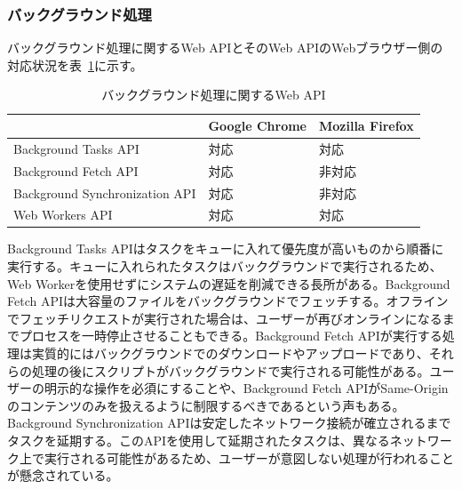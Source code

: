 \subsubsection{バックグラウンド処理}\label{subsubsection:バックグラウンド処理}
バックグラウンド処理に関するWeb APIとそのWeb APIのWebブラウザー側の対応状況を表~\ref{table:バックグラウンド処理に関するWeb API}に示す。
\begin{table}
  \caption{バックグラウンド処理に関するWeb API}\label{table:バックグラウンド処理に関するWeb API}
  \centering
  \begin{tabular}{|p{20em}|p{10em}|p{10em}|}
    \hline
    & Google Chrome & Mozilla Firefox \\ \hline
    Background Tasks API & 対応 & 対応 \\ \hline
    Background Fetch API & 対応 & 非対応 \\ \hline
    Background Synchronization API & 対応 & 非対応 \\ \hline
    Web Workers API & 対応 & 対応 \\ \hline
  \end{tabular}

\end{table}
Background Tasks APIはタスクをキューに入れて優先度が高いものから順番に実行する。キューに入れられたタスクはバックグラウンドで実行されるため、Web Workerを使用せずにシステムの遅延を削減できる長所がある。Background Fetch APIは大容量のファイルをバックグラウンドでフェッチする。オフラインでフェッチリクエストが実行された場合は、ユーザーが再びオンラインになるまでプロセスを一時停止させることもできる。Background Fetch APIが実行する処理は実質的にはバックグラウンドでのダウンロードやアップロードであり、それらの処理の後にスクリプトがバックグラウンドで実行される可能性がある。ユーザーの明示的な操作を必須にすることや、Background Fetch APIがSame-Originのコンテンツのみを扱えるように制限するべきであるという声もある。Background Synchronization APIは安定したネットワーク接続が確立されるまでタスクを延期する。このAPIを使用して延期されたタスクは、異なるネットワーク上で実行される可能性があるため、ユーザーが意図しない処理が行われることが懸念されている。

